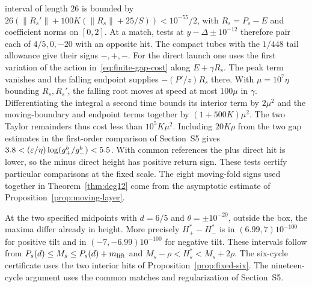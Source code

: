 interval of length $26$ is bounded by
$26(\|R_s'\|+100K(\|R_s\|+25/S))<10^{-55}/2$, with $R_s=P_s-E$
and coefficient norms on $[0,2]$. At a match, tests at
$y-\Delta\pm10^{-12}$ therefore pair each of $4/5,0,-20$ with an
opposite hit. The compact tubes with the $1/448$ tail allowance give
their signs $-,+,-$. For the direct launch one uses the first variation
of the action in~\eqref{eq:finite-gap-cost} along $E+\gamma R_s$.
The peak term vanishes and the falling endpoint supplies
$-(P'/z)R_s$ there. With $\mu=10^7\eta$ bounding $R_s,R_s'$,
the falling root moves at speed at most $100\mu$ in $\gamma$.
Differentiating the integral a second time bounds its interior term
by $2\mu^2$ and the moving-boundary and endpoint terms together by
$(1+500K)\mu^2$. The two Taylor remainders thus cost less than
$10^5K\mu^2$. Including $20K\rho$ from the two gap estimates in the
first-order comparison of Section~S5 gives
$3.8<(\varepsilon/\eta)\log(g_+^b/g_-^b)<5.5$. With common references
the plus direct hit is lower, so the minus direct height has positive
return sign. These tests certify particular comparisons at the fixed
scale. The eight moving-fold signs used together in
Theorem~\ref{thm:deg12} come from the asymptotic estimate of
Proposition~\ref{prop:moving-layer}.

At the two specified midpoints with $d=6/5$ and
$\theta=\pm10^{-20}$, outside the box, the maxima differ already in
height. More precisely $H_+^*-H_-^*$ is in $(6.99,7)10^{-100}$ for
positive tilt and in $(-7,-6.99)10^{-100}$ for negative tilt. These
intervals follow from $P_s(d)\le M_s\le P_s(d)+m_{\rm lift}$ and
$M_s-\rho<H_s^*<M_s+2\rho$. The six-cycle certificate uses the two
interior hits of Proposition~\ref{prop:fixed-six}. The nineteen-cycle
argument uses the common matches and regularization of Section~S5.

